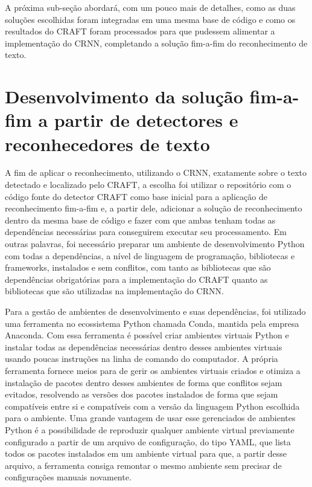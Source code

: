 A próxima sub-seção abordará, com um pouco mais de detalhes, como as duas soluções escolhidas foram integradas em uma mesma base de código e como os resultados do CRAFT foram processados para que pudessem alimentar a implementação do CRNN, completando a solução fim-a-fim do reconhecimento de texto. 

\section{Desenvolvimento da solução fim-a-fim a partir de detectores e reconhecedores de texto}\label{sec:metodologia_desenvolvimento}

A fim de aplicar o reconhecimento, utilizando o CRNN, exatamente sobre o texto detectado e localizado pelo CRAFT, a escolha foi utilizar o repositório com o código fonte do detector CRAFT como base inicial para a aplicação de reconhecimento fim-a-fim e, a partir dele, adicionar a solução de reconhecimento dentro da mesma base de código e fazer com que ambas tenham todas as dependências necessárias para conseguirem executar seu processamento. Em outras palavras, foi necessário preparar um ambiente de desenvolvimento Python com todas a dependências, a nível de linguagem de programação, bibliotecas e frameworks, instalados e sem conflitos, com tanto as bibliotecas que são dependências obrigatórias para a implementação do CRAFT quanto as bibliotecas que são utilizadas na implementação do CRNN.

Para a gestão de ambientes de desenvolvimento e suas dependências, foi utilizado uma ferramenta no ecossistema Python chamada Conda, mantida pela empresa Anaconda. Com essa ferramenta é possível criar ambientes virtuais Python e instalar todas as dependências necessárias dentro desses ambientes virtuais usando poucas instruções na linha de comando do computador. A própria ferramenta fornece meios para de gerir os ambientes virtuais criados e otimiza a instalação de pacotes dentro desses ambientes de forma que conflitos sejam evitados, resolvendo as versões dos pacotes instalados de forma que sejam compatíveis entre si e compatíveis com a versão da linguagem Python escolhida para o ambiente. Uma grande vantagem de usar esse gerenciados de ambientes Python é a possibilidade de reproduzir qualquer ambiente virtual previamente configurado a partir de um arquivo de configuração, do tipo YAML, que lista todos os pacotes instalados em um ambiente virtual para que, a partir desse arquivo, a ferramenta consiga remontar o mesmo ambiente sem precisar de configurações manuais novamente.

